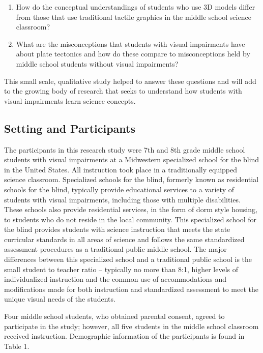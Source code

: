 \documentclass[11.5pt]{sig-alternate} %
\begin{document}
\begin{large}
 \begin{enumerate}
     \item How do the conceptual understandings of students who use 3D models differ from those that use traditional tactile graphics in the middle school science classroom?
     \item What are the misconceptions that students with visual impairments have about plate tectonics and how do these compare to misconceptions held by middle school students without visual impairments?
 \end{enumerate}

This small scale, qualitative study helped to answer these questions and will add to the growing body of research that seeks to understand how students with visual impairments learn science concepts.  

\subsection*{Setting and Participants}

The participants in this research study were 7th and 8th grade middle school students with visual impairments at a Midwestern specialized school for the blind in the United States.  All instruction took place in a traditionally equipped science classroom.  Specialized schools for the blind, formerly known as residential schools for the blind, typically provide educational services to a variety of students with visual impairments, including those with multiple disabilities.  These schools also provide residential services, in the form of dorm style housing, to students who do not reside in the local community.  This specialized school for the blind provides students with science instruction that meets the state curricular standards in all areas of science and follows the same standardized assessment procedures as a traditional public middle school.  The major differences between this specialized school and a traditional public school is the small student to teacher ratio – typically no more than 8:1, higher levels of individualized instruction and the common use of accommodations and modifications made for both instruction and standardized assessment to meet the unique visual needs of the students. 

Four middle school students, who obtained parental consent, agreed to participate in the study; however, all five students in the middle school classroom received instruction.  Demographic information of the participants is found in Table 1.


\end{large}
\end{document}
